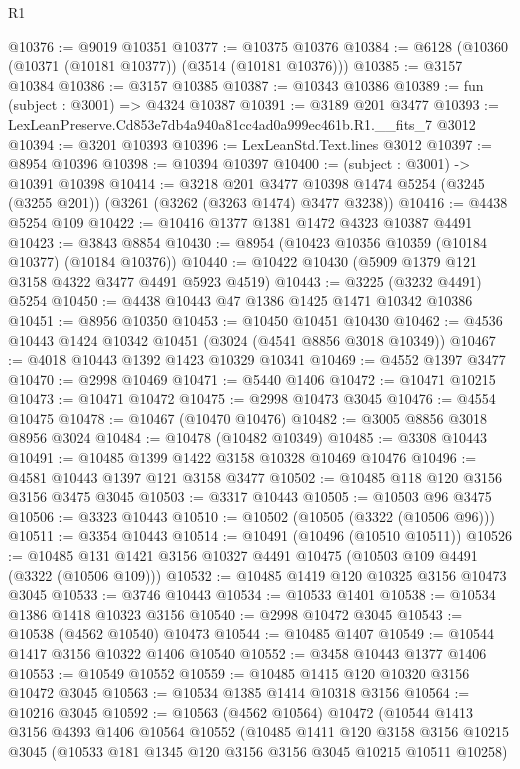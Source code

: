 \begin{lexlean}{R1}
\begin{coremodule}
@10376 := @9019 @10351
@10377 := @10375 @10376
@10384 := @6128 (@10360 (@10371 (@10181 @10377)) (@3514 (@10181 @10376)))
@10385 := @3157 @10384
@10386 := @3157 @10385
@10387 := @10343 @10386
@10389 := fun (subject : @3001) => @4324 @10387
@10391 := @3189 @201 @3477
@10393 := LexLeanPreserve.Cd853e7db4a940a81cc4ad0a999ec461b.R1.__fits_7 @3012
@10394 := @3201 @10393
@10396 := LexLeanStd.Text.lines @3012
@10397 := @8954 @10396
@10398 := @10394 @10397
@10400 := (subject : @3001) -> @10391 @10398
@10414 := @3218
    @201
    @3477
    @10398
    @1474
    @5254
    (@3245 (@3255 @201))
    (@3261 (@3262 (@3263 @1474) @3477 @3238))
@10416 := @4438 @5254 @109
@10422 := @10416 @1377 @1381 @1472 @4323 @10387 @4491
@10423 := @3843 @8854
@10430 := @8954 (@10423 @10356 @10359 (@10184 @10377) (@10184 @10376))
@10440 := @10422 @10430 (@5909 @1379 @121 @3158 @4322 @3477 @4491 @5923 @4519)
@10443 := @3225 (@3232 @4491) @5254
@10450 := @4438 @10443 @47 @1386 @1425 @1471 @10342 @10386
@10451 := @8956 @10350
@10453 := @10450 @10451 @10430
@10462 := @4536 @10443 @1424 @10342 @10451 (@3024 (@4541 @8856 @3018 @10349))
@10467 := @4018 @10443 @1392 @1423 @10329 @10341
@10469 := @4552 @1397 @3477
@10470 := @2998 @10469
@10471 := @5440 @1406
@10472 := @10471 @10215
@10473 := @10471 @10472
@10475 := @2998 @10473 @3045
@10476 := @4554 @10475
@10478 := @10467 (@10470 @10476)
@10482 := @3005 @8856 @3018 @8956 @3024
@10484 := @10478 (@10482 @10349)
@10485 := @3308 @10443
@10491 := @10485 @1399 @1422 @3158 @10328 @10469 @10476
@10496 := @4581 @10443 @1397 @121 @3158 @3477
@10502 := @10485 @118 @120 @3156 @3156 @3475 @3045
@10503 := @3317 @10443
@10505 := @10503 @96 @3475
@10506 := @3323 @10443
@10510 := @10502 (@10505 (@3322 (@10506 @96)))
@10511 := @3354 @10443
@10514 := @10491 (@10496 (@10510 @10511))
@10526 := @10485 @131 @1421 @3156 @10327 @4491 @10475 (@10503 @109 @4491 (@3322 (@10506 @109)))
@10532 := @10485 @1419 @120 @10325 @3156 @10473 @3045
@10533 := @3746 @10443
@10534 := @10533 @1401
@10538 := @10534 @1386 @1418 @10323 @3156
@10540 := @2998 @10472 @3045
@10543 := @10538 (@4562 @10540) @10473
@10544 := @10485 @1407
@10549 := @10544 @1417 @3156 @10322 @1406 @10540
@10552 := @3458 @10443 @1377 @1406
@10553 := @10549 @10552
@10559 := @10485 @1415 @120 @10320 @3156 @10472 @3045
@10563 := @10534 @1385 @1414 @10318 @3156
@10564 := @10216 @3045
@10592 := @10563
    (@4562 @10564)
    @10472
    (@10544
      @1413
      @3156
      @4393
      @1406
      @10564
      @10552
      (@10485
        @1411
        @120
        @3158
        @3156
        @10215
        @3045
        (@10533 @181 @1345 @120 @3156 @3156 @3045 @10215 @10511 @10258)

\end{coremodule}
\end{lexlean}
